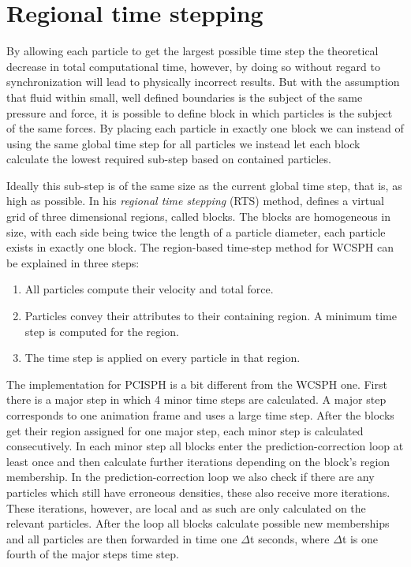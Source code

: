 \documentclass[../../main.tex]{subfiles}
\begin{document}
\section{Regional time stepping}
By allowing each particle to get the largest possible time step the theoretical decrease in total computational time, however, by doing so without regard to synchronization will lead to physically incorrect results. But with the assumption that fluid within small, well defined boundaries is the subject of the same pressure and force, it is possible to define block in which particles is the subject of the same forces. By placing each particle in exactly one block we can instead of using the same global time step for all particles we instead let each block calculate the lowest required sub-step based on contained particles. 

Ideally this sub-step is of the same size as the current global time step, that is, as high as possible.
In his \textit{regional time stepping} (RTS) method, \citet{goswami2014regional} defines a virtual grid of three dimensional regions, called blocks. The blocks are homogeneous in size, with each side being twice the length of a particle diameter, each particle exists in exactly one block. The region-based time-step method for WCSPH can be explained in three steps:

\begin{enumerate}
\item All particles compute their velocity and total force. 
\item Particles convey their attributes to their containing region. A minimum time step is computed for the region. 
\item The time step is applied on every particle in that region. 
\end{enumerate}

The implementation for PCISPH is a bit different from the WCSPH one. First there is a major step in which 4 minor time steps are calculated. A major step corresponds to one animation frame and uses a large time step. After the blocks get their region assigned for one major step, each minor step is calculated consecutively. In each minor step all blocks enter the prediction-correction loop at least once and then calculate further iterations depending on the block's region membership. In the prediction-correction loop we also check if there are any particles which still have erroneous densities, these also receive more iterations. These iterations, however, are local and as such are only calculated on the relevant particles. After the loop all blocks calculate possible new memberships and all particles are then forwarded in time one $\Delta$t seconds, where $\Delta$t is one fourth of the major steps time step. 
\end{document}
